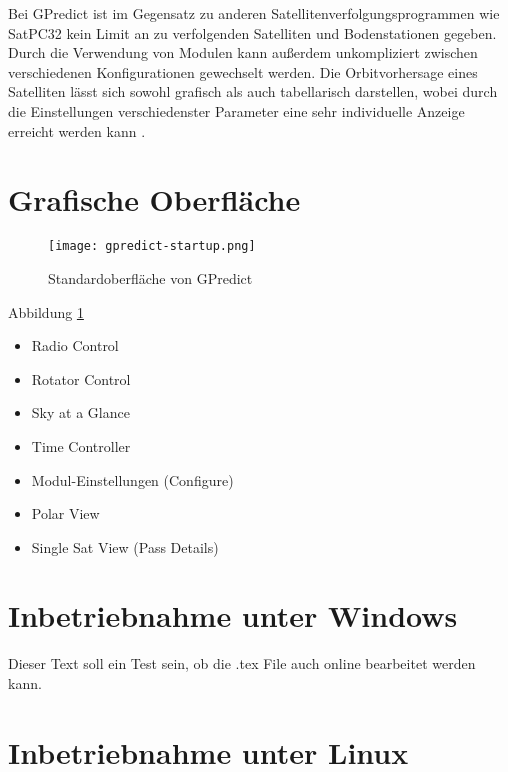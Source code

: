 \clearpage

Bei GPredict ist im Gegensatz zu anderen Satellitenverfolgungsprogrammen wie SatPC32 kein Limit an zu verfolgenden Satelliten und Bodenstationen gegeben. Durch die Verwendung von Modulen kann außerdem unkompliziert zwischen verschiedenen Konfigurationen gewechselt werden. Die Orbitvorhersage eines Satelliten lässt sich sowohl grafisch als auch tabellarisch darstellen, wobei durch die Einstellungen verschiedenster Parameter eine sehr individuelle Anzeige erreicht werden kann \cite{gpredictsource}.

\section{Grafische Oberfläche}

\begin{figure}[h]
	\centering
	\texttt{[image: gpredict-startup.png]}
	\caption{Standardoberfläche von GPredict}
	\label{fig:gpredictstartup} 
\end{figure}

\clearpage

Abbildung \ref{fig:gpredictstartup}

\begin{itemize}
	\parskip0pt
	\item Radio Control
	\item Rotator Control
	\item Sky at a Glance
	\item Time Controller
	\item Modul-Einstellungen (Configure)
	\item Polar View
	\item Single Sat View (Pass Details)
\end{itemize}

\clearpage

\section{Inbetriebnahme unter Windows}

Dieser Text soll ein Test sein, ob die .tex File auch online bearbeitet werden kann.

\section{Inbetriebnahme unter Linux}
